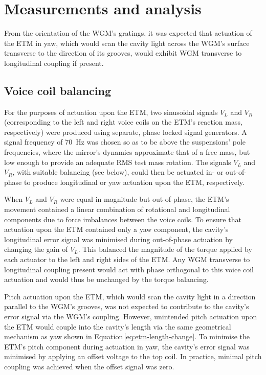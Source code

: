 \section{\label{sec:measurements}Measurements and analysis}

From the orientation of the \gls{WGM}'s gratings, it was expected that actuation of the \gls{ETM} in yaw, which would scan the cavity light across the \gls{WGM}'s surface transverse to the direction of its grooves, would exhibit \gls{WGM} transverse to longitudinal coupling if present.

\subsection{Voice coil balancing}
For the purposes of actuation upon the \gls{ETM}, two sinusoidal signals $V_L$ and $V_R$ (corresponding to the left and right voice coils on the \gls{ETM}'s reaction mass, respectively) were produced using separate, phase locked signal generators. A signal frequency of \SI{70}{\hertz} was chosen so as to be above the suspensions' pole frequencies, where the mirror's dynamics approximate that of a free mass, but low enough to provide an adequate \gls{RMS} test mass rotation. The signals $V_L$ and $V_R$, with suitable balancing (see below), could then be actuated in- or out-of-phase to produce longitudinal or yaw actuation upon the \gls{ETM}, respectively.

When $V_L$ and $V_R$ were equal in magnitude but out-of-phase, the \gls{ETM}'s movement contained a linear combination of rotational and longitudinal components due to force imbalances between the voice coils. To ensure that actuation upon the \gls{ETM} contained only a yaw component, the cavity's longitudinal error signal was minimised during out-of-phase actuation by changing the gain of $V_L$. This balanced the magnitude of the torque applied by each actuator to the left and right sides of the \gls{ETM}. Any \gls{WGM} transverse to longitudinal coupling present would act with phase orthogonal to this voice coil actuation and would thus be unchanged by the torque balancing.

Pitch actuation upon the \gls{ETM}, which would scan the cavity light in a direction parallel to the \gls{WGM}'s grooves, was not expected to contribute to the cavity's error signal via the \gls{WGM}'s coupling. However, unintended pitch actuation upon the \gls{ETM} would couple into the cavity's length via the same geometrical mechanism as yaw shown in Equation\,\ref{eq:etm-length-change}. To minimise the \gls{ETM}'s pitch component during actuation in yaw, the cavity's error signal was minimised by applying an offset voltage to the top coil. In practice, minimal pitch coupling was achieved when the offset signal was zero.

